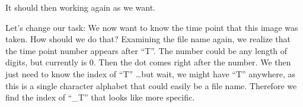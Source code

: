 It should then working again as we want.

Let's change our task: We now want to know the time point that this image was taken. How should we do that? Examining the file name again, we realize that the time point number appears after ``T''. The number could be any length of digits, but currently is 0. Then the dot comes right after the number. We then just need to know the index of ``T'' \ldots but wait, we might have ``T'' anywhere, as this is a single character alphabet that could easily be a file name. Therefore we find the index of ``\_T'' that looks like more specific.